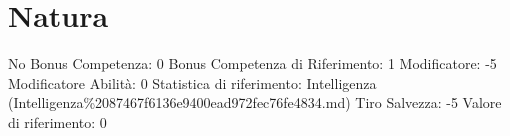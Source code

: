 \section{Natura}\label{natura}

\begin{description}
\tightlist
\item[Tags: ABI]
No Bonus Competenza: 0 Bonus Competenza di Riferimento: 1 Modificatore:
-5 Modificatore Abilità: 0 Statistica di riferimento: Intelligenza
(Intelligenza\%2087467f6136e9400ead972fec76fe4834.md) Tiro Salvezza: -5
Valore di riferimento: 0
\end{description}
